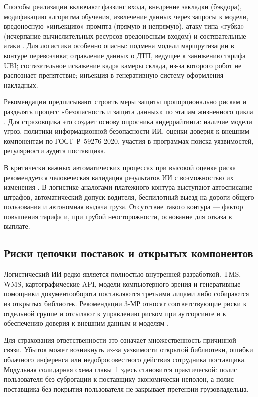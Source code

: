 \documentclass[a4paper,14pt]{extarticle}
\begin{document}
Способы реализации включают фаззинг входа, внедрение закладки (бэкдора), модификацию алгоритма обучения, извлечение данных через запросы к модели, вредоносную «инъекцию» промпта (прямую и непрямую), атаку типа «губка» (исчерпание вычислительных ресурсов вредоносным входом) и состязательные атаки \cite{cbr}. Для логистики особенно опасны: подмена модели маршрутизации в контуре перевозчика; отравление данных о ДТП, ведущее к занижению тарифа UBI; состязательное искажение кадра камеры склада, из-за которого робот не распознает препятствие; инъекция в генеративную систему оформления накладных.

Рекомендации предписывают строить меры защиты пропорционально рискам и разделять процесс «безопасность и защита данных» по этапам жизненного цикла \cite{cbr}. Для страховщика это создает основу опросника андеррайтинга: наличие модели угроз, политики информационной безопасности ИИ, оценки доверия к внешним компонентам по ГОСТ~Р~59276-2020, участия в программах поиска уязвимостей, регулярности аудита поставщика.

В критически важных автоматических процессах при высокой оценке риска рекомендуется человеческая валидация результатов ИИ с возможностью их изменения \cite{cbr}. В логистике аналогами платежного контура выступают автосписание штрафов, автоматический допуск водителя, беспилотный выезд на дороги общего пользования и автономная выдача груза. Отсутствие такого контура --- фактор повышения тарифа и, при грубой неосторожности, основание для отказа в выплате.

\subsection{Риски цепочки поставок и открытых компонентов}

Логистический ИИ редко является полностью внутренней разработкой. TMS, WMS, картографические API, модели компьютерного зрения и генеративные помощники документооборота поставляются третьими лицами либо собираются из открытых библиотек. Рекомендации 3-МР относят соответствующие риски к отдельной группе и отсылают к управлению риском при аутсорсинге и к обеспечению доверия к внешним данным и моделям \cite{cbr}.

Для страхования ответственности это означает множественность причинной связи. Убыток может возникнуть из-за уязвимости открытой библиотеки, ошибки облачного инференса или недобросовестного действия сотрудника поставщика. Модульная солидарная схема главы~1 здесь становится практической: полис пользователя без суброгации к поставщику экономически неполон, а полис поставщика без покрытия пользователя не закрывает претензии грузовладельца.
\end{document}
